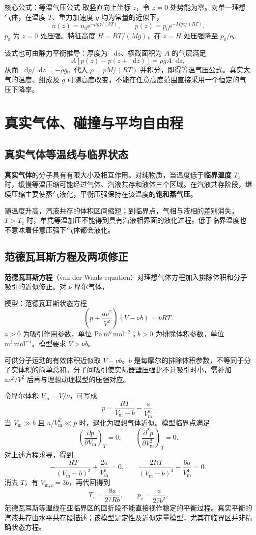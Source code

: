 \documentclass[UTF8,fontset=none,zihao=-4,a4paper]{ctexart}
\newcommand{\chapterpage}[1]{\clearpage\section{#1}}
\newcommand{\term}[1]{\textbf{#1}}
\newcommand{\dd}{\mathop{}\!\mathrm{d}}
\newcommand{\ee}{\mathrm{e}}
\begin{document}
\begin{infobox}{核心公式：等温气压公式}
取竖直向上坐标 $z$，令 $z=0$ 处势能为零。对单一理想气体，在温度 $T$、重力加速度 $g$ 均为常量的近似下，
\[
 n(z)=n_0\ee^{-\mu gz/(kT)},\qquad
 p(z)=p_0\ee^{-Mgz/(RT)}.
\]
$p_0$ 为 $z=0$ 处压强。特征高度 $H=RT/(Mg)$，在 $z=H$ 处压强降至 $p_0/\ee$。
\end{infobox}
该式也可由静力平衡推导：厚度为 $\dd z$、横截面积为 $A$ 的气层满足
\[
 A[p(z)-p(z+\dd z)]=\rho gA\dd z,
\]
从而 $\dd p/\dd z=-\rho g$。代入 $\rho=pM/(RT)$ 并积分，即得等温气压公式。真实大气的温度、组成及 $g$ 可随高度改变，不能在任意高度范围直接采用一个恒定的气压下降率。


\chapterpage{真实气体、碰撞与平均自由程}
\subsection{真实气体等温线与临界状态}
\term{真实气体}的分子具有有限大小及相互作用。对纯物质，当温度低于\term{临界温度} $T_{\mathrm c}$ 时，缓慢等温压缩可能经过气体、汽液共存和液体三个区域。在汽液共存阶段，继续压缩主要使蒸气液化，平衡压强保持在该温度的\term{饱和蒸气压}。

随温度升高，汽液共存的体积区间缩短；到临界点，气相与液相的差别消失。$T>T_{\mathrm c}$ 时，单凭等温加压不能得到具有汽液相界面的液化过程。低于临界温度也不意味着任意压强下气体都会液化。

\subsection{范德瓦耳斯方程及两项修正}
\term{范德瓦耳斯方程}（van der Waals equation）对理想气体方程加入排除体积和分子吸引的近似修正。对 $\nu$ 摩尔气体，
\begin{infobox}{模型：范德瓦耳斯状态方程}
\[
 \left(p+\frac{a\nu^2}{V^2}\right)(V-\nu b)=\nu RT.
\]
$a>0$ 为吸引作用参数，单位 $\mathrm{Pa\,m^6\,mol^{-2}}$；$b>0$ 为排除体积参数，单位 $\mathrm{m^3\,mol^{-1}}$。模型要求 $V>\nu b$。
\end{infobox}
可供分子运动的有效体积近似取 $V-\nu b$。$b$ 是每摩尔的排除体积参数，不等同于分子实体积的简单总和。分子间吸引使实际器壁压强比不计吸引时小，需补加 $a\nu^2/V^2$ 后再与理想动理模型的压强对应。

令摩尔体积 $V_{\mathrm m}=V/\nu$，可写成
\[
 p=\frac{RT}{V_{\mathrm m}-b}-\frac{a}{V_{\mathrm m}^2}.
\]
当 $V_{\mathrm m}\gg b$ 且 $a/V_{\mathrm m}^2\ll p$ 时，退化为理想气体近似。模型临界点满足
\[
 \left(\frac{\partial p}{\partial V_{\mathrm m}}\right)_T=0,
 \qquad
 \left(\frac{\partial^2p}{\partial V_{\mathrm m}^2}\right)_T=0.
\]
对上述方程求导，得到
\[
 -\frac{RT}{(V_{\mathrm m}-b)^2}+\frac{2a}{V_{\mathrm m}^3}=0,
 \qquad
 \frac{2RT}{(V_{\mathrm m}-b)^3}-\frac{6a}{V_{\mathrm m}^4}=0.
\]
消去 $T$，有 $V_{\mathrm m,c}=3b$，再代回得到
\[
 T_{\mathrm c}=\frac{8a}{27Rb},\qquad
 p_{\mathrm c}=\frac{a}{27b^2}.
\]
范德瓦耳斯等温线在亚临界区的回折段不能直接视作稳定的平衡过程。真实平衡的汽液共存由水平共存段描述；该模型是定性及近似定量模型，尤其在临界区并非精确状态方程。
\end{document}

